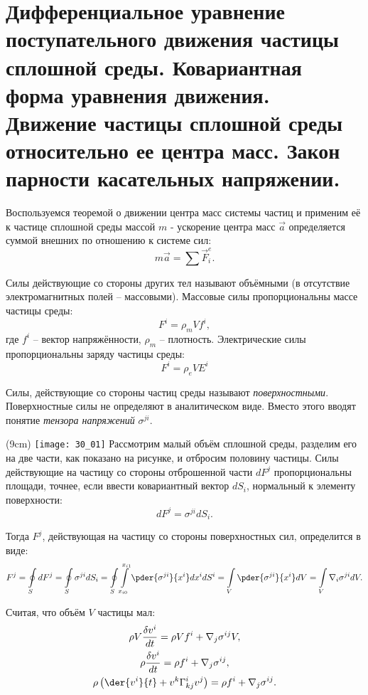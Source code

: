 \chapter{Дифференциальное уравнение поступательного движения частицы сплошной
среды. Ковариантная форма уравнения движения. Движение частицы сплошной
среды относительно ее центра масс. Закон парности касательных напряжении.}

Воспользуемся теоремой о движении центра масс системы частиц и применим её к
частице сплошной среды массой \( m \) - ускорение центра масс \( \vec{a} \)
определяется суммой внешних по отношению к системе сил:
\[
    m\vec{a} = \sum \vec{F}_i^e.
\]

Силы действующие со стороны других тел называют объёмными (в отсутствие
электромагнитных полей -- массовыми). Массовые силы пропорциональны массе
частицы среды:
\[
    F^i = \rho_m V f^i,
\]
где \( f^i \) -- вектор напряжённости, \( \rho_m  \) -- плотность. Электрические
силы пропорциональны заряду частицы среды:
\[
    F^i = \rho_e V E^i
\]

Силы, действующие со стороны частиц среды называют \emph{поверхностными}.
Поверхностные силы не определяют в аналитическом виде. Вместо этого вводят
понятие \emph{тензора напряжений} \( \sigma^{ji} \).

\sidefig(9cm)
{\texttt{[image: 30\_01]}}{
Рассмотрим малый объём сплошной среды, разделим его на две части, как показано
на рисунке, и отбросим половину частицы. Силы действующие на частицу со стороны
отброшенной части \( dF^j \) пропорциональны площади, точнее, если ввести
ковариантный вектор \( dS_i \), нормальный к элементу поверхности: 
\[
    dF^j = \sigma^{ji} dS_i.
\]
}

Тогда \( F^j \), действующая на частицу со стороны поверхностных сил,
определится в виде:
\[
    F^j = 
    \oint\limits_S dF^j = 
    \oint\limits_S \sigma^{ji} dS_i =
    \oint\limits_S \int\limits_{x_{i0}}^{x_{i1}} \pder{\sigma^{ji}}{x^i} dx^i
    dS^i =
    \int\limits_V \pder{\sigma^{ji}}{x^i} dV =
    \int\limits_V \nabla_i \sigma^{ji} dV.
\]
    
Считая, что объём \( V \) частицы мал:
\begin{gather*}
    \rho V \frac{\delta v^i}{dt} = \rho V f^i + \nabla_j \sigma^{ij} V,\\
    \rho \frac{\delta v^i}{dt} = \rho f^i + \nabla_j \sigma^{ij}, \\
    \rho \left( \der{v^i}{t} + v^k \Gamma^i_{kj} v^j\right) = \rho f^i +
    \nabla_j \sigma^{ij}.
\end{gather*}


